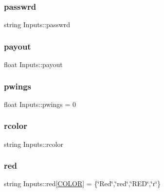 \subsubsection{\texorpdfstring{passwrd}{passwrd}}
{\footnotesize\ttfamily string Inputs\+::passwrd}

\mbox{\label{struct_inputs_ae019de875b0b547d9f6ff125068762c0}} 
\subsubsection{\texorpdfstring{payout}{payout}}
{\footnotesize\ttfamily float Inputs\+::payout}

\mbox{\label{struct_inputs_a3ec027582343b553787b0e956a84bfae}} 
\subsubsection{\texorpdfstring{pwings}{pwings}}
{\footnotesize\ttfamily float Inputs\+::pwings = 0}

\mbox{\label{struct_inputs_a3b8bbe1d2d8f1736d88f6130e800ac16}} 
\subsubsection{\texorpdfstring{rcolor}{rcolor}}
{\footnotesize\ttfamily string Inputs\+::rcolor}

\mbox{\label{struct_inputs_a7e6f084b57b2515a6d260d422b252f37}} 
\subsubsection{\texorpdfstring{red}{red}}
{\footnotesize\ttfamily string Inputs\+::red\mbox{[}\hyperlink{main_8cpp_aa6d8034c897057de595a4511a4e7a837}{C\+O\+L\+OR}\mbox{]} = \{\char`\"{}Red\char`\"{},\char`\"{}red\char`\"{},\char`\"{}R\+ED\char`\"{},\char`\"{}r\char`\"{}\}}

\mbox{\label{struct_inputs_ab43ee7fc7282e8dadf5ae6d40453ccda}} 
